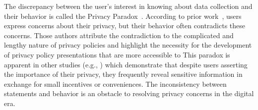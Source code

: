 The discrepancy between the user's interest in knowing about data collection and their behavior is called the Privacy Paradox~\cite{barnes2006privacy}.
According to prior work~\cite{acquisti2015privacy}, users express concerns about their privacy, but their behavior often contradicts these concerns.
Those authors attribute the contradiction to the complicated and lengthy nature of privacy policies and highlight the necessity for the development of privacy policy presentations that are more accessible to 
This paradox is apparent in other studies (e.g., \cite{norberg2007privacy}) which demonstrate that despite users asserting the importance of their privacy, they frequently reveal sensitive information in exchange for small incentives or conveniences.
The inconsistency between statements and behavior is an obstacle to resolving privacy concerns in the digital era.


